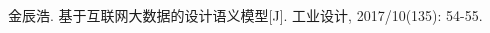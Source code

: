 
\begin{publications}{99}
  \item\textsc{金辰浩}. {基于互联网大数据的设计语义模型}[J]. 工业设计, 2017/10(135): 54-55.
\end{publications}
